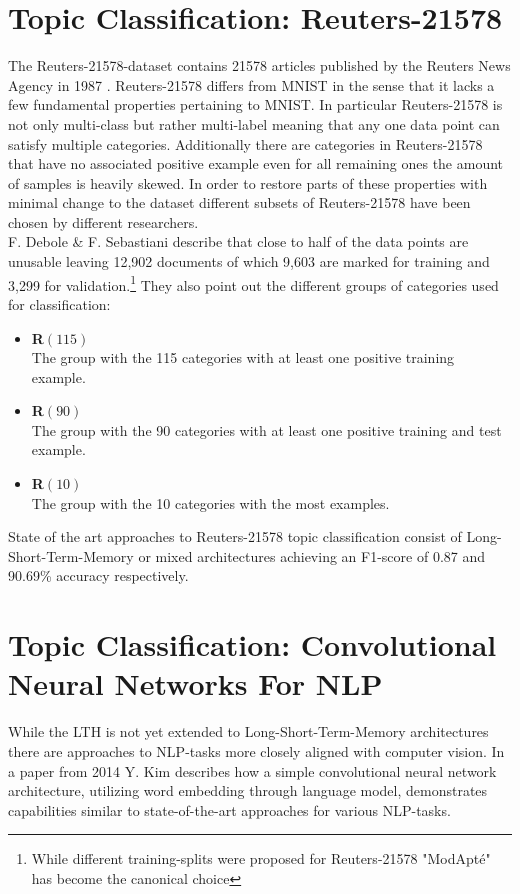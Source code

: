 \section{Topic Classification: Reuters-21578}
The Reuters-21578-dataset contains 21578 articles published by the Reuters News Agency in 1987 \cite{Reuters-21578}. Reuters-21578 differs from MNIST in the sense that it lacks a few fundamental properties pertaining to MNIST. In particular Reuters-21578 is not only multi-class but rather multi-label meaning that any one data point can satisfy multiple categories. Additionally there are categories in Reuters-21578 that have no associated positive example even for all remaining ones the amount of samples is heavily skewed. In order to restore parts of these properties with minimal change to the dataset different subsets of Reuters-21578 have been chosen by different researchers.\\
F. Debole \& F. Sebastiani \cite{Reuters-Subsets} describe that close to half of the data points are unusable leaving 12,902 documents of which 9,603 are marked for training and 3,299 for validation.\footnote{While different training-splits were proposed for Reuters-21578 "ModApt\'e" has become the canonical choice} They also point out the different groups of categories used for classification:
\begin{itemize}
	\item \textbf{R$\left(115\right)$}\\
	The group with the 115 categories with at least one positive training example.\\ 
	\item \textbf{R$\left(90\right)$}\\
	The group with the 90 categories with at least one positive training and test example.\\ 
	\item \textbf{R$\left(10\right)$}\\
	The group with the 10 categories with the most examples. \\
\end{itemize} 
State of the art approaches to Reuters-21578 topic classification consist of Long-Short-Term-Memory \cite{Rethinking-LSTM} or mixed architectures \cite{RMDL} achieving an F1-score of 0.87 and 90.69\% accuracy respectively.

\section{Topic Classification: Convolutional Neural Networks For NLP}
While the LTH is not yet extended to Long-Short-Term-Memory architectures there are approaches to NLP-tasks more closely aligned with computer vision. In a paper from 2014 \cite{CNN-For-NLP} Y. Kim describes how a simple convolutional neural network architecture, utilizing word embedding through language model, demonstrates capabilities similar to state-of-the-art approaches for various NLP-tasks.

